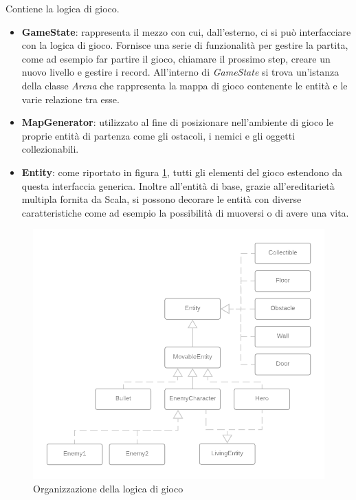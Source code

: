 Contiene la logica di gioco. 

\begin{itemize}
    \item \textbf{GameState}: rappresenta il mezzo con cui, dall'esterno, ci si può interfacciare con la logica di gioco. Fornisce una serie di funzionalità per gestire la partita, come ad esempio far partire il gioco, chiamare il prossimo step, creare un nuovo livello e gestire i record. All'interno di \textit{GameState} si trova un'istanza della classe \textit{Arena} che rappresenta la mappa di gioco contenente le entità e le varie relazione tra esse.
    
    \item \textbf{MapGenerator}: utilizzato al fine di posizionare nell'ambiente di gioco le proprie entità di partenza come gli ostacoli, i nemici e gli oggetti collezionabili.
    
    \item \textbf{Entity}: come riportato in figura \ref{model}, tutti gli elementi del gioco estendono da questa interfaccia generica. Inoltre  all'entità di base, grazie all'ereditarietà multipla fornita da Scala, si possono decorare le entità con diverse caratteristiche come ad esempio la possibilità di muoversi o di avere una vita. 
\end{itemize}

\begin{figure}[H]
  \includegraphics[width=15cm]{report/res/GAMELOGIC_Diagram.png}
  \caption{Organizzazione della logica di gioco}
  \label{model}
\end{figure}